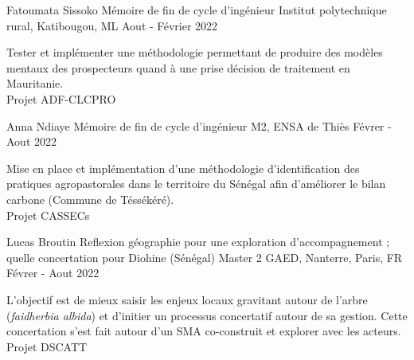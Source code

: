 \begin{cventries}
    \cventry
        {Fatoumata Sissoko} %
        {Mémoire de fin de cycle d'ingénieur} %
        {Institut polytechnique rural, Katibougou, ML} %
        {Aout - Février 2022} %
        {
        \begin{cvitems} %
            Tester et implémenter une méthodologie permettant de produire des modèles mentaux des prospecteurs quand à une prise décision de traitement en Mauritanie.\\
            Projet ADF-CLCPRO
        \end{cvitems}
        }


    \cventry
        {Anna Ndiaye} %
        {Mémoire de fin de cycle d'ingénieur} %
        {M2, ENSA de Thiès} %
        {Févrer - Aout 2022} %
        {
        \begin{cvitems} %
            Mise en place et implémentation d'une méthodologie d'identification des pratiques agropastorales dans le territoire du Sénégal afin d’améliorer le bilan carbone (Commune de Téssékéré).\\
            Projet CASSECs
        \end{cvitems}
        }


    \cventry
        {Lucas Broutin} %
        {Reflexion géographie pour une exploration d'accompagnement ; quelle concertation pour Diohine (Sénégal)} %
        {Master 2 GAED, Nanterre, Paris, FR} %
        {Févrer - Aout 2022} %
        {
        \begin{cvitems} %
            L'objectif est de mieux saisir les enjeux locaux gravitant autour de l’arbre (\textit{faidherbia albida}) et d'initier un processus concertatif autour de sa gestion. Cette concertation s'est fait autour d'un SMA co-construit et explorer avec les acteurs.\\
            Projet DSCATT
        \end{cvitems}
        }



\end{cventries}
